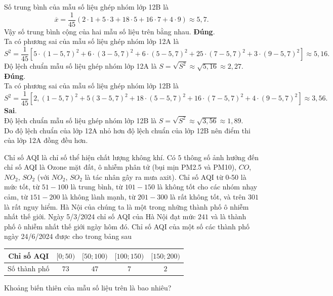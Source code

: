 \begin{ex}
{\begin{itemchoice}
\begin{center}
\begin{tabular}{|c|c|c|c|c|c|}
						\hline			
					\end{tabular}
				\end{center}
				Số trung bình của mẫu số liệu ghép nhóm lớp 12B là				
				\[\overline{x}=\dfrac{1}{45}\left(2\cdot 1+5\cdot 3+18\cdot 5+16\cdot 7+4\cdot 9 \right)
				\approx 5{,}7.\]
				Vậy số trung bình cộng của hai mẫu số liệu trên bằng nhau.
				\itemch \textbf{Đúng}.\\
				Ta có phương sai của mẫu số liệu ghép nhóm lớp 12A là\\
				\[S^2=\dfrac{1}{45}\left[ 
				  5\cdot (1-5{,}7)^2
				+ 6\cdot (3-5{,}7)^2
				+ 6\cdot (5-5{,}7)^2
				+25\cdot (7-5{,}7)^2
				+ 3\cdot (9-5{,}7)^2 \right]
				\approx 5{,}16.\]
				Độ lệch chuẩn mẫu số liệu ghép nhóm lớp 12A là $S=\sqrt{S^2}\approx \sqrt{5{,}16}\approx 2{,}27$.
				\itemch \textbf{Đúng}.\\
				Ta có phương sai của mẫu số liệu ghép nhóm lớp 12B là
				\[S^2=\dfrac{1}{45}\left[ 2{,}(1-5{,}7)^2+5(3-5{,}7)^2+18\cdot (5-5{,}7)^2+16\cdot (7-5{,}7)^2+4\cdot (9-5{,}7)^2 \right]\approx 3{,}56.\]
				\itemch \textbf{Sai}.\\
				Độ lệch chuẩn mẫu số liệu ghép nhóm lớp 12B là $S=\sqrt{S^2}\approx \sqrt{3{,}56}\approx 1{,}89$.\\
				Do độ lệch chuẩn của lớp 12A nhỏ hơn độ lệch chuẩn của lớp 12B nên điểm thi của lớp 12A đồng đều hơn.
			\end{itemchoice}
}
\end{ex}

\begin{bt}%
	Chỉ số AQI là chỉ số thể hiện chất lượng không khí. Có $5$ thông số ảnh hưởng đến chỉ số AQI là Ozone mặt đất, ô nhiễm phân tử (bụi mịn PM2.5 và PM10), $CO$, $NO_2$, $SO_2$ (với $NO_2$, $SO_2$ là tác nhân gây ra mưa axit). Chỉ số AQI từ 0-50 là mức tốt, từ $51-100$ là trung bình, từ $101-150$ là không tốt cho các nhóm nhạy cảm, từ $151-200$ là không lành mạnh, từ $201-300$ là rất không tốt, và trên $301$ là rất nguy hiểm. Hà Nội của chúng ta là một trong những thành phố ô nhiễm nhất thế giới. Ngày 5/3/2024 chỉ số AQI của Hà Nội đạt mức $241$ và là thành phố ô nhiễm nhất thế giới ngày hôm đó. Chỉ số AQI của một số các thành phố ngày 24/6/2024 được cho trong bảng sau
	\begin{center}
		\begin{tabular}{|c|c|c|c|c|}
			\hline
			Chỉ số AQI&$[0;50)$&$[50;100)$&$[100;150)$&$[150;200)$\\
			\hline
			Số thành phố&$73$&$47$&$7$&$2$\\
			\hline
		\end{tabular}
	\end{center}	
	Khoảng biến thiên của mẫu số liệu trên là bao nhiêu?
\end{bt}

